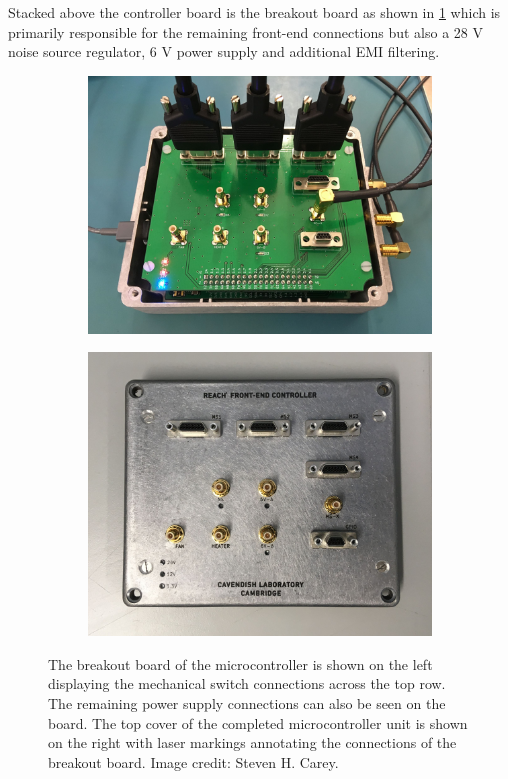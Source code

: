 Stacked above the controller board is the breakout board as shown in \cref{fig:break_board} which is primarily responsible for the remaining front-end connections but also a 28 V noise source regulator, 6 V power supply and additional EMI filtering.
\begin{figure}
\centering
    \centering
    \begin{subfigure}{.5\textwidth}
        \centering
        \includegraphics[width=\linewidth]{ucon}
    \end{subfigure}
    \hfill
    \begin{subfigure}{.45\textwidth}
    \centering
        \includegraphics[width=\linewidth]{ucon_cover}
    \end{subfigure}
    \caption{The breakout board of the microcontroller is shown on the left displaying the mechanical switch connections across the top row. The remaining power supply connections can also be seen on the board. The top cover of the completed microcontroller unit is shown on the right with laser markings annotating the connections of the breakout board. Image credit: Steven H. Carey.}
    \label{fig:break_board}
\end{figure}
